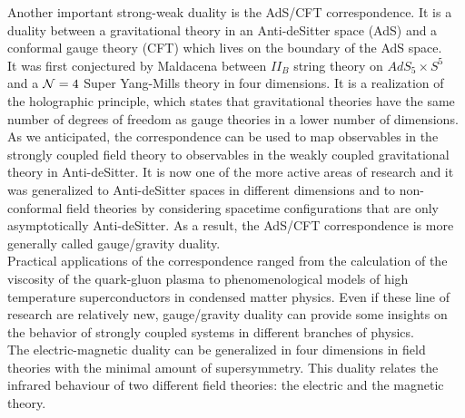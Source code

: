Another important strong-weak duality is the AdS/CFT correspondence. 
It is a duality  between a gravitational theory in an Anti-deSitter space (AdS) and a conformal gauge theory (CFT) which lives on the boundary of the AdS space. \\
It was first conjectured by Maldacena \cite{Maldacena:1997re} between $II_B$ string theory on $AdS_5 \times S^5$ and a $\mathcal{N}=4$ Super Yang-Mills theory in four dimensions. 
It is a realization of the holographic principle, which states that gravitational theories have the same number of degrees of freedom as gauge theories in a lower number of dimensions.\\
As we anticipated, the correspondence can be used to map observables in the strongly coupled field theory to observables in the weakly coupled gravitational theory in Anti-deSitter.
It is now one of the more active areas of research and it was generalized to Anti-deSitter spaces in different dimensions and to non-conformal field theories by considering spacetime configurations that are only asymptotically Anti-deSitter.
As a result, the AdS/CFT correspondence is more generally called gauge/gravity duality.  \\
Practical applications of the correspondence ranged from the calculation of the viscosity of the quark-gluon plasma to phenomenological models of high temperature superconductors in condensed matter physics.
Even if these line of research are relatively new, gauge/gravity duality can provide some insights on the behavior of strongly coupled systems in different branches of physics.   
\\ 
The electric-magnetic duality can be generalized in four dimensions in field theories with the minimal amount of supersymmetry.
This duality relates the infrared behaviour of two different field theories: the electric and the magnetic theory.



